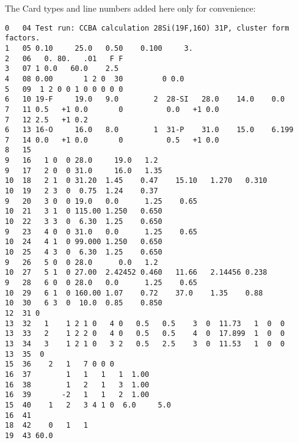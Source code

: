 \documentclass[11pt]{article}
\begin{document}
The Card types and line numbers added here only for convenience:
\small
\begin{verbatim}
0   04 Test run: CCBA calculation 28Si(19F,16O) 31P, cluster form factors.
1   05 0.10     25.0   0.50    0.100     3.
2   06   0. 80.   .01   F F
3   07 1 0.0   60.0    2.5
4   08 0.00       1 2 0  30         0 0.0
5   09  1 2 0 0 1 0 0 0 0 0
6   10 19-F     19.0   9.0        2  28-SI   28.0    14.0    0.0
7   11 0.5   +1 0.0       0          0.0   +1 0.0
7   12 2.5   +1 0.2
6   13 16-O     16.0   8.0        1  31-P    31.0    15.0    6.199
7   14 0.0   +1 0.0       0          0.5   +1 0.0
8   15
9   16   1 0  0 28.0     19.0   1.2
9   17   2 0  0 31.0     16.0   1.35
10  18   2 1  0 31.20  1.45    0.47    15.10   1.270   0.310
10  19   2 3  0  0.75  1.24    0.37
9   20   3 0  0 19.0   0.0      1.25    0.65
10  21   3 1  0 115.00 1.250   0.650
10  22   3 3  0  6.30  1.25    0.650
9   23   4 0  0 31.0   0.0      1.25    0.65
10  24   4 1  0 99.000 1.250   0.650
10  25   4 3  0  6.30  1.25    0.650
9   26   5 0  0 28.0      0.0   1.2
10  27   5 1  0 27.00  2.42452 0.460   11.66   2.14456 0.238
9   28   6 0  0 28.0   0.0      1.25    0.65
10  29   6 1  0 160.00 1.07    0.72    37.0    1.35    0.88
10  30   6 3  0  10.0  0.85    0.850
12  31 0
13  32   1    1 2 1 0   4 0   0.5   0.5    3  0  11.73   1  0  0
13  33   2    1 2 2 0   4 0   0.5   0.5    4  0  17.899  1  0  0
13  34   3    1 2 1 0   3 2   0.5   2.5    3  0  11.53   1  0  0
13  35  0
15  36    2   1   7 0 0 0
16  37        1   1   1   1  1.00
16  38        1   2   1   3  1.00
16  39       -2   1   1   2  1.00
15  40    1   2   3 4 1 0  6.0     5.0
16  41
18  42    0   1   1
19  43 60.0
\end{verbatim}
\end{document}
